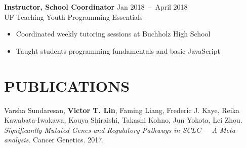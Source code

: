 \documentclass[line,resmargin]{res}
\begin{document}
\begin{resume}
    \textbf{Instructor, School Coordinator}    \hfill Jan 2018~--~April 2018 \\
    UF Teaching Youth Programming Essentials
    \begin{itemize}  \itemsep -2pt
        \item Coordinated weekly tutoring sessions at Buchholz High School
        \item Taught students programming fundamentals and basic JavaScript
    \end{itemize}

\section{PUBLICATIONS}
    Varsha Sundaresan, \textbf{Victor T. Lin}, Faming Liang, Frederic J. Kaye, Reika Kawabata-Iwakawa, Kouya Shiraishi, Takashi Kohno, Jun Yokota, Lei Zhou.
    \textit{Significantly Mutated Genes and Regulatory Pathways in SCLC~--~A Meta-analysis}. Cancer Genetics. 2017.

\end{resume}
\end{document}
